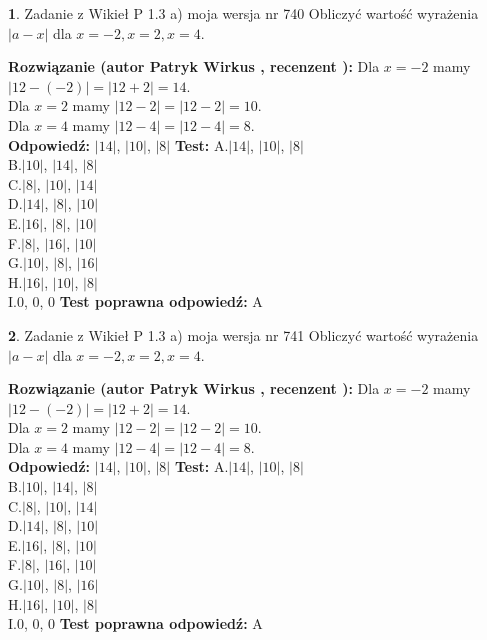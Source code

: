 \documentclass[12pt, a4paper]{article}
\theoremstyle{definition} %
\newtheorem{zad}{}
\newcommand{\zadStart}[1]{\begin{zad}#1\newline}
\newcommand{\zadStop}{\end{zad}}
\newcommand{\rozwStart}[2]{\noindent \textbf{Rozwiązanie (autor #1 , recenzent #2): }\newline}
\newcommand{\rozwStop}{\newline}
\newcommand{\odpStart}{\noindent \textbf{Odpowiedź:}\newline}
\newcommand{\odpStop}{\newline}
\newcommand{\testStart}{\noindent \textbf{Test:}\newline}
\newcommand{\testStop}{\newline}
\newcommand{\kluczStart}{\noindent \textbf{Test poprawna odpowiedź:}\newline}
\newcommand{\kluczStop}{\newline}
\begin{document}
\zadStart{Zadanie z Wikieł P 1.3 a) moja wersja nr 740}
Obliczyć wartość wyrażenia $|a - x|$ dla $x=-2,x=2,x=4$.
\zadStop
\rozwStart{Patryk Wirkus}{}
Dla $x = -2$ mamy $|12 - (-2)| = |12 + 2| = 14$.\\
Dla $x = 2$ mamy $|12 - 2| = |12 - 2| = 10$.\\
Dla $x = 4$ mamy $|12 - 4| = |12 - 4| = 8$.\\
\rozwStop
\odpStart
$|14|$, $|10|$, $|8|$
\odpStop
\testStart
A.$|14|$, $|10|$, $|8|$\\
B.$|10|$, $|14|$, $|8|$\\
C.$|8|$, $|10|$, $|14|$\\
D.$|14|$, $|8|$, $|10|$\\
E.$|16|$, $|8|$, $|10|$\\
F.$|8|$, $|16|$, $|10|$\\
G.$|10|$, $|8|$, $|16|$\\
H.$|16|$, $|10|$, $|8|$\\
I.$0$, $0$, $0$
\testStop
\kluczStart
A
\kluczStop



\zadStart{Zadanie z Wikieł P 1.3 a) moja wersja nr 741}
Obliczyć wartość wyrażenia $|a - x|$ dla $x=-2,x=2,x=4$.
\zadStop
\rozwStart{Patryk Wirkus}{}
Dla $x = -2$ mamy $|12 - (-2)| = |12 + 2| = 14$.\\
Dla $x = 2$ mamy $|12 - 2| = |12 - 2| = 10$.\\
Dla $x = 4$ mamy $|12 - 4| = |12 - 4| = 8$.\\
\rozwStop
\odpStart
$|14|$, $|10|$, $|8|$
\odpStop
\testStart
A.$|14|$, $|10|$, $|8|$\\
B.$|10|$, $|14|$, $|8|$\\
C.$|8|$, $|10|$, $|14|$\\
D.$|14|$, $|8|$, $|10|$\\
E.$|16|$, $|8|$, $|10|$\\
F.$|8|$, $|16|$, $|10|$\\
G.$|10|$, $|8|$, $|16|$\\
H.$|16|$, $|10|$, $|8|$\\
I.$0$, $0$, $0$
\testStop
\kluczStart
A
\kluczStop
\end{document}
